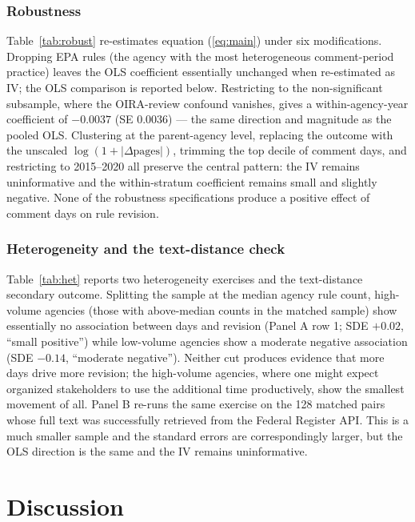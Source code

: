 \documentclass[12pt]{article}
\begin{document}
\subsubsection*{Robustness} Table~\ref{tab:robust} re-estimates equation (\ref{eq:main}) under six modifications. Dropping EPA rules (the agency with the most heterogeneous comment-period practice) leaves the OLS coefficient essentially unchanged when re-estimated as IV; the OLS comparison is reported below. Restricting to the non-significant subsample, where the OIRA-review confound vanishes, gives a within-agency-year coefficient of $-0.0037$ (SE $0.0036$) --- the same direction and magnitude as the pooled OLS. Clustering at the parent-agency level, replacing the outcome with the unscaled $\log(1+|\Delta\text{pages}|)$, trimming the top decile of comment days, and restricting to 2015--2020 all preserve the central pattern: the IV remains uninformative and the within-stratum coefficient remains small and slightly negative. None of the robustness specifications produce a positive effect of comment days on rule revision.





\subsubsection*{Heterogeneity and the text-distance check} Table~\ref{tab:het} reports two heterogeneity exercises and the text-distance secondary outcome. Splitting the sample at the median agency rule count, high-volume agencies (those with above-median counts in the matched sample) show essentially no association between days and revision (Panel A row 1; SDE $+0.02$, ``small positive'') while low-volume agencies show a moderate negative association (SDE $-0.14$, ``moderate negative''). Neither cut produces evidence that more days drive more revision; the high-volume agencies, where one might expect organized stakeholders to use the additional time productively, show the smallest movement of all. Panel B re-runs the same exercise on the 128 matched pairs whose full text was successfully retrieved from the Federal Register API. This is a much smaller sample and the standard errors are correspondingly larger, but the OLS direction is the same and the IV remains uninformative.

\section{Discussion}
\end{document}
